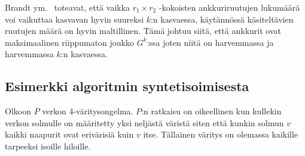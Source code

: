 \documentclass[12pt,finnish]{tktltiki2}
\theoremstyle{definition}
\theoremstyle{remark}
\begin{document}
Brandt ym.~\cite{brandt} toteavat, että vaikka $r_1 \times r_2$ -kokoisten ankkuriruutujen lukumäärä voi vaikuttaa kasvavan hyvin suureksi $k$:n kasvaessa, käytännössä käsiteltävien ruutujen määrä on hyvin maltillinen. Tämä johtuu siitä, että ankkurit ovat maksimaalinen riippumaton joukko $G^k$:ssa joten niitä on harvemmassa ja harvemmassa $k$:n kasvaessa.

\subsection{Esimerkki algoritmin syntetisoimisesta}
Olkoon $P$ verkon 4-väritysongelma. $P$:n ratkaisu on oikeellinen kun kullekin verkon solmulle on määritetty yksi neljästä väristä siten että kunkin solmun $v$ kaikki naapurit ovat erivärisiä kuin $v$ itse. Tällainen väritys on olemassa kaikille tarpeeksi isoille hiloille.
\end{document}
